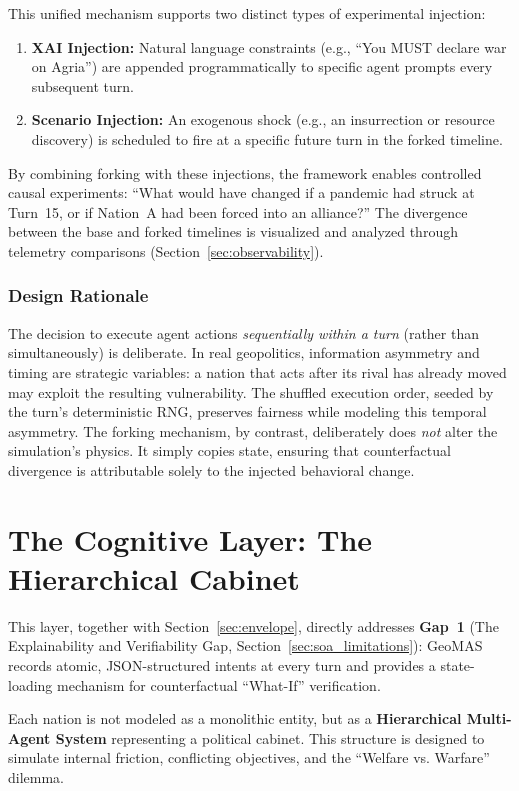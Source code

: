 This unified mechanism supports two distinct types of experimental injection:
\begin{enumerate}
    \item \textbf{XAI Injection:} Natural language constraints (e.g., ``You MUST declare war on Agria'') are appended programmatically to specific agent prompts every subsequent turn.
    \item \textbf{Scenario Injection:} An exogenous shock (e.g., an insurrection or resource discovery) is scheduled to fire at a specific future turn in the forked timeline.
\end{enumerate}

By combining forking with these injections, the framework enables controlled causal experiments: ``What would have changed if a pandemic had struck at Turn~15, or if Nation~A had been forced into an alliance?'' The divergence between the base and forked timelines is visualized and analyzed through telemetry comparisons (Section~\ref{sec:observability}).

\subsubsection{Design Rationale}
The decision to execute agent actions \textit{sequentially within a turn} (rather than simultaneously) is deliberate. In real geopolitics, information asymmetry and timing are strategic variables: a nation that acts after its rival has already moved may exploit the resulting vulnerability. The shuffled execution order, seeded by the turn's deterministic RNG, preserves fairness while modeling this temporal asymmetry. The forking mechanism, by contrast, deliberately does \textit{not} alter the simulation's physics. It simply copies state, ensuring that counterfactual divergence is attributable solely to the injected behavioral change.


\section{The Cognitive Layer: The Hierarchical Cabinet}
\label{sec:cognitive_architecture}
This layer, together with Section~\ref{sec:envelope}, directly addresses \textbf{Gap~1} (The Explainability and Verifiability Gap, Section~\ref{sec:soa_limitations}): GeoMAS records atomic, JSON-structured intents at every turn and provides a state-loading mechanism for counterfactual ``What-If'' verification.

Each nation is not modeled as a monolithic entity, but as a \textbf{Hierarchical Multi-Agent System} representing a political cabinet. This structure is designed to simulate internal friction, conflicting objectives, and the ``Welfare vs. Warfare'' dilemma.

